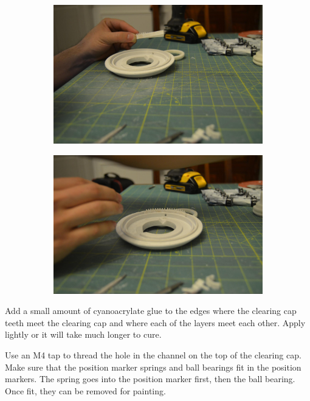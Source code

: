 \documentclass[openany]{book}
\begin{document}
\begin{figure}[!ht]
	\centering
	\begin{subfigure}{.4\textwidth}
		\centering
		\includegraphics[width=.95\textwidth]{images/image22.jpg}
		\caption{}
		\label{fig:image22}	
	\end{subfigure}
	\begin{subfigure}{.4\textwidth}
		\centering
		\includegraphics[width=.95\textwidth]{images/image23.jpg}
		\caption{}
		\label{fig:image23}	
	\end{subfigure}
	\caption{}
\end{figure}




Add a small amount of cyanoacrylate glue to the edges where the clearing cap teeth meet the clearing cap and where each of the layers meet each other. Apply lightly or it will take much longer to cure.

Use an M4 tap to thread the hole in the channel on the top of the clearing cap. Make sure that the position marker springs and ball bearings fit in the position markers. The spring goes into the position marker  first, then the ball bearing. Once fit, they can be removed for painting.
\end{document}
